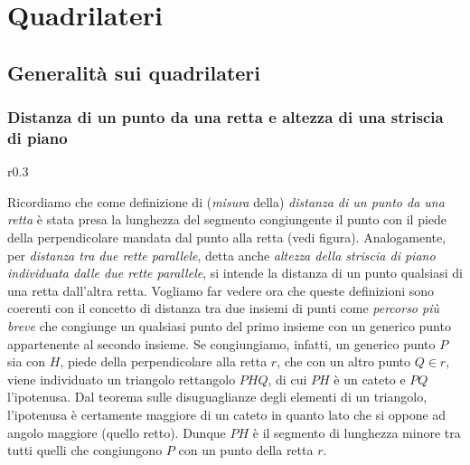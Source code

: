 
\chapter{Quadrilateri}\label{chap:quadrilateri}


\section{Generalità sui quadrilateri} 
  \label{sect:generalita_quadrilateri}

\subsection{Distanza di un punto da una retta e altezza di una 
  striscia di piano}

\begin{wrapfigure}{r}{0.3\textwidth}
  \centering
\end{wrapfigure}
Ricordiamo che come definizione di (\emph{misura} della) 
\emph{distanza di un punto da una retta} è stata presa la lunghezza 
del segmento congiungente il punto con il piede della perpendicolare 
mandata dal punto alla retta (vedi figura). Analogamente, per 
\emph{distanza tra due rette parallele}, detta anche \emph{altezza 
  della striscia di piano individuata dalle due rette parallele}, si 
intende la distanza di un punto qualsiasi di una retta dall'altra 
retta. Vogliamo far vedere ora che queste definizioni sono coerenti 
con il concetto di distanza tra due insiemi di punti come 
\emph{percorso più breve} che congiunge un qualsiasi punto del primo 
insieme con un generico punto appartenente al secondo insieme. Se 
congiungiamo, infatti, un generico punto \(P\) sia con \(H\), piede della 
perpendicolare alla retta \(r\), che con un altro punto \(Q\in r\), viene 
individuato un triangolo rettangolo \(PHQ\), di cui \(PH\) è un cateto e 
\(PQ\) l'ipotenusa. Dal teorema sulle disuguaglianze degli elementi di 
un triangolo, l'ipotenusa è certamente maggiore di un cateto in 
quanto lato che si oppone ad angolo maggiore (quello retto). Dunque 
\(PH\) è il segmento di lunghezza minore tra tutti quelli che 
congiungono \(P\) con un punto della retta \(r\).

